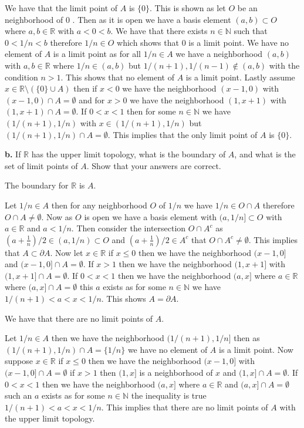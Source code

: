 \documentclass{amsart}
\theoremstyle{plain}
\theoremstyle{definition}
\theoremstyle{remark}
\begin{document}
We have that the limit point of $A$ is $\{0\}$. This is shown as let $O$ be an neighborhood of $0$
. Then as it is open we have a basis element $ (a,b)\subset O$ where $a,b\in \mathbb{R}$ with $a<0<b$. We have that there exists $n\in \mathbb{N}$ such that $0<1/n<b$ therefore $1/n\in O$ which shows that $0$ is a limit point. We have no element of $A$ is a limit point as for all $1/n\in A$ we have a neighborhood $(a,b)$ with $a,b\in \mathbb{R}$ where $1/n \in (a,b)$ but $1/(n+1),1/(n-1)\not \in (a,b)$ with the condition $n>1$. This shows that no element of $A$ is a limit point. Lastly assume $x\in \mathbb{R}\setminus(\{0\}\cup A)$ then if $x<0$ we have the neighborhood $(x-1,0)$ with $(x-1,0)\cap A=\emptyset$ and for $x>0$ we have the neighborhood $(1,x+1)$ with $(1,x+1)\cap A=\emptyset$. If $0<x<1$ then for some $n\in \mathbb{N}$ we have $(1/(n+1),1/n)$ with $x\in (1/(n+1),1/n)$ but $(1/(n+1),1/n)\cap A= \emptyset$. This implies that the only limit point of $A$ is $\{0\}$. 

\vspace{.1in}
{\bfseries b.} If $\mathbb R$ has the upper limit topology, what is the boundary of $A$, and what is the set of limit points of $A$. Show that your answers are correct. 

The boundary for $\mathbb R$ is $A$.


Let $1/n\in A$ then for any neighborhood $O$ of $1/n$ we have $1/n\in O \cap A$ therefore $O\cap A\not = \emptyset$. Now as $O$ is open we have a basis element with $(a,1/n]\subset O$ with $a\in \mathbb{R}$ and $a<1/n$. Then consider the intersection $O \cap A^c$ as $(a+\frac{1}{n})/2 \in (a,1/n)\subset O$ and $(a+\frac{1}{n})/2\in A^c$ that $O\cap A^c \not = \emptyset$. This implies that $A\subset \partial A$. Now let $x\in \mathbb{R}$ if $x\leq 0$ then we have the neighborhood $(x-1,0]$ and $(x-1,0]\cap A=\emptyset$. If $x>1$ then we have the neighborhood $(1,x+1]$ with $(1,x+1]\cap A=\emptyset$. If $0<x<1$ then we have the neighborhood $(a,x]$ where $a\in \mathbb R$ where $(a,x]\cap A=\emptyset$ this $a$ exists as for some $n\in \mathbb{N}$ we have $1/(n+1)<a<x<1/n$. 
This shows $A=\partial A$. 

We have that there are no limit points of $A$. 

Let $1/n\in A$ then we have the neighborhood $(1/(n+1),1/n]$ then as $(1/(n+1),1/n)\cap A=\{1/n\}$ we have no element of $A$ is a limit point. Now suppose $x\in \mathbb{R}$ if $x\leq 0$ then we have the neighborhood $(x-1,0]$ with $(x-1,0]\cap A=\emptyset$ if $x>1$ then $(1,x]$ is a neighborhood of $x$ and $(1,x]\cap A=\emptyset$. If $0<x<1$ then we have the neighborhood $(a,x]$ where $a\in \mathbb{R}$ and $(a,x]\cap A=\emptyset$ such an $a$ exists as for some $n\in \mathbb{N}$ the inequality is true $1/(n+1)<a<x<1/n$. This implies that there are no limit points of $A$ with the upper limit topology.
\end{document}
